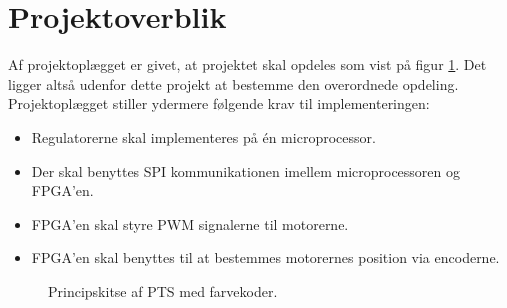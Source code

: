 \section{Projektoverblik}
\label{sec:projektoverblik}

Af projektoplægget er givet, at projektet skal opdeles som vist på 
figur \ref{fig:overview_openloop_PTS}. 
Det ligger altså udenfor dette projekt at bestemme den overordnede opdeling.
Projektoplægget stiller ydermere følgende krav til implementeringen:
\begin{itemize}
  \item Regulatorerne skal implementeres på én microprocessor.
  \item Der skal benyttes SPI kommunikationen imellem microprocessoren og FPGA’en.
  \item FPGA’en skal styre PWM signalerne til motorerne.
  \item FPGA’en skal benyttes til at bestemmes motorernes position via encoderne.
\end{itemize}

\bigskip

\begin{figure}[!th]
\centering
\begin{tikzpicture}[auto, node distance=1cm,>=latex']

\end{tikzpicture}
\caption[Principskitse af PTS]{Principskitse af PTS med farvekoder.}
\label{fig:overview_openloop_PTS}
\end{figure}

